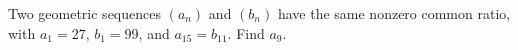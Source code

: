 Two geometric sequences $(a_n)$ and $(b_n)$ have the same nonzero common ratio, with $a_1=27$, $b_1=99$, and $a_{15}=b_{11}$. Find $a_9$.
